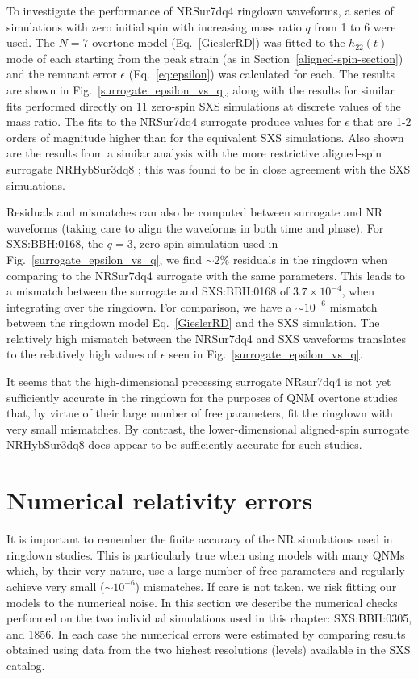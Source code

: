 To investigate the performance of NRSur7dq4 ringdown waveforms, a series of simulations with zero initial spin with increasing mass ratio $q$ from 1 to 6 were used. 
The $N=7$ overtone model (Eq.~\ref{GieslerRD}) was fitted to the $h_{22}(t)$ mode of each starting from the peak strain (as in Section~\ref{aligned-spin-section})
and the remnant error $\epsilon$ (Eq.~\ref{eq:epsilon}) was calculated for each.
The results are shown in Fig.~\ref{surrogate_epsilon_vs_q}, along with the results for similar fits performed directly on 11 zero-spin SXS simulations at discrete values of the mass ratio. 
The fits to the NRSur7dq4 surrogate produce values for $\epsilon$ that are 1-2 orders of magnitude higher than for the equivalent SXS simulations. 
Also shown are the results from a similar analysis with the more restrictive aligned-spin surrogate NRHybSur3dq8 \cite{Varma:2018mmi}; this was found to be in close agreement with the SXS simulations.

Residuals and mismatches can also be computed between surrogate and NR waveforms (taking care to align the waveforms in both time and phase).
For SXS:BBH:0168, the $q=3$, zero-spin simulation used in Fig.~\ref{surrogate_epsilon_vs_q}, we find $\sim 2\%$ residuals in the ringdown when comparing to the NRSur7dq4 surrogate with the same parameters. 
This leads to a mismatch between the surrogate and SXS:BBH:0168 of $3.7 \times 10^{-4}$, when integrating over the ringdown. For comparison, we have a $\sim 10^{-6}$ mismatch between the ringdown model Eq.~\eqref{GieslerRD} and the SXS simulation. The relatively high mismatch between the NRSur7dq4 and SXS waveforms translates to the relatively high values of $\epsilon$ seen in Fig.~\ref{surrogate_epsilon_vs_q}. 

It seems that the high-dimensional precessing surrogate NRsur7dq4 is not yet sufficiently accurate in the ringdown for the purposes of QNM overtone studies that, by virtue of their large number of free parameters, fit the ringdown with very small mismatches. 
By contrast, the lower-dimensional aligned-spin surrogate NRHybSur3dq8 does appear to be sufficiently accurate for such studies.


\section{Numerical relativity errors}\label{NR_error_appendix}

It is important to remember the finite accuracy of the NR simulations used in ringdown studies.
This is particularly true when using models with many QNMs which, by their very nature, use a large number of free parameters and regularly achieve very small ($\sim 10^{-6}$) mismatches.
If care is not taken, we risk fitting our models to the numerical noise. 
In this section we describe the numerical checks performed on the two individual simulations used in this chapter: SXS:BBH:0305, and 1856. %
In each case the numerical errors were estimated by comparing results obtained using data from the two highest resolutions (levels) available in the SXS catalog. 

